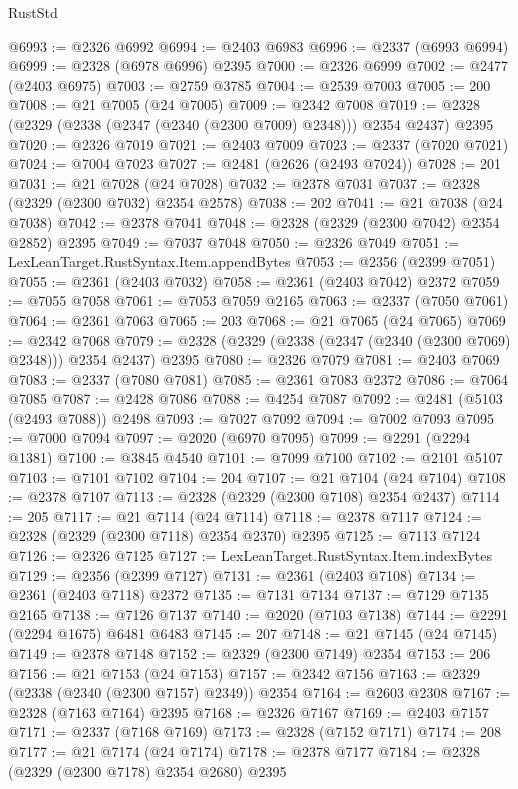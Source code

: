 \begin{lexlean}{RustStd}
\begin{coremodule}
@6993 := @2326 @6992
@6994 := @2403 @6983
@6996 := @2337 (@6993 @6994)
@6999 := @2328 (@6978 @6996) @2395
@7000 := @2326 @6999
@7002 := @2477 (@2403 @6975)
@7003 := @2759 @3785
@7004 := @2539 @7003
@7005 := 200
@7008 := @21 @7005 (@24 @7005)
@7009 := @2342 @7008
@7019 := @2328 (@2329 (@2338 (@2347 (@2340 (@2300 @7009) @2348))) @2354 @2437) @2395
@7020 := @2326 @7019
@7021 := @2403 @7009
@7023 := @2337 (@7020 @7021)
@7024 := @7004 @7023
@7027 := @2481 (@2626 (@2493 @7024))
@7028 := 201
@7031 := @21 @7028 (@24 @7028)
@7032 := @2378 @7031
@7037 := @2328 (@2329 (@2300 @7032) @2354 @2578)
@7038 := 202
@7041 := @21 @7038 (@24 @7038)
@7042 := @2378 @7041
@7048 := @2328 (@2329 (@2300 @7042) @2354 @2852) @2395
@7049 := @7037 @7048
@7050 := @2326 @7049
@7051 := LexLeanTarget.RustSyntax.Item.appendBytes
@7053 := @2356 (@2399 @7051)
@7055 := @2361 (@2403 @7032)
@7058 := @2361 (@2403 @7042) @2372
@7059 := @7055 @7058
@7061 := @7053 @7059 @2165
@7063 := @2337 (@7050 @7061)
@7064 := @2361 @7063
@7065 := 203
@7068 := @21 @7065 (@24 @7065)
@7069 := @2342 @7068
@7079 := @2328 (@2329 (@2338 (@2347 (@2340 (@2300 @7069) @2348))) @2354 @2437) @2395
@7080 := @2326 @7079
@7081 := @2403 @7069
@7083 := @2337 (@7080 @7081)
@7085 := @2361 @7083 @2372
@7086 := @7064 @7085
@7087 := @2428 @7086
@7088 := @4254 @7087
@7092 := @2481 (@5103 (@2493 @7088)) @2498
@7093 := @7027 @7092
@7094 := @7002 @7093
@7095 := @7000 @7094
@7097 := @2020 (@6970 @7095)
@7099 := @2291 (@2294 @1381)
@7100 := @3845 @4540
@7101 := @7099 @7100
@7102 := @2101 @5107
@7103 := @7101 @7102
@7104 := 204
@7107 := @21 @7104 (@24 @7104)
@7108 := @2378 @7107
@7113 := @2328 (@2329 (@2300 @7108) @2354 @2437)
@7114 := 205
@7117 := @21 @7114 (@24 @7114)
@7118 := @2378 @7117
@7124 := @2328 (@2329 (@2300 @7118) @2354 @2370) @2395
@7125 := @7113 @7124
@7126 := @2326 @7125
@7127 := LexLeanTarget.RustSyntax.Item.indexBytes
@7129 := @2356 (@2399 @7127)
@7131 := @2361 (@2403 @7108)
@7134 := @2361 (@2403 @7118) @2372
@7135 := @7131 @7134
@7137 := @7129 @7135 @2165
@7138 := @7126 @7137
@7140 := @2020 (@7103 @7138)
@7144 := @2291 (@2294 @1675) @6481 @6483
@7145 := 207
@7148 := @21 @7145 (@24 @7145)
@7149 := @2378 @7148
@7152 := @2329 (@2300 @7149) @2354
@7153 := 206
@7156 := @21 @7153 (@24 @7153)
@7157 := @2342 @7156
@7163 := @2329 (@2338 (@2340 (@2300 @7157) @2349)) @2354
@7164 := @2603 @2308
@7167 := @2328 (@7163 @7164) @2395
@7168 := @2326 @7167
@7169 := @2403 @7157
@7171 := @2337 (@7168 @7169)
@7173 := @2328 (@7152 @7171)
@7174 := 208
@7177 := @21 @7174 (@24 @7174)
@7178 := @2378 @7177
@7184 := @2328 (@2329 (@2300 @7178) @2354 @2680) @2395

\end{coremodule}
\end{lexlean}

